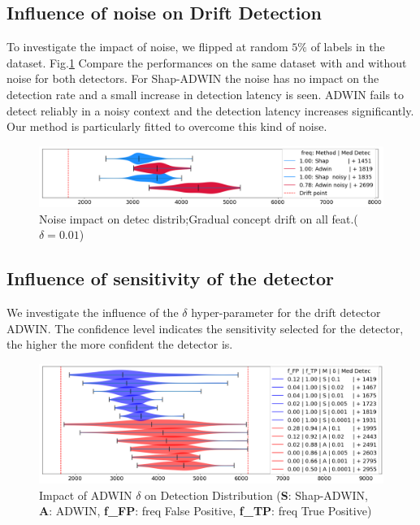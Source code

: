 \documentclass[runningheads]{llncs}
\begin{document}
\subsection{Influence of noise on Drift Detection}
To investigate the impact of noise, we flipped at random $5\%$ of labels in the dataset. Fig.\ref{fig: noise_violin} Compare the performances on the same dataset with and without noise for both detectors. For Shap-ADWIN the noise has no impact on the detection rate and a small increase in detection latency is seen. ADWIN fails to detect reliably in a noisy context and the detection latency increases significantly. Our method is particularly fitted to overcome this kind of noise.

\begin{figure}[htbp]
    \begin{center}
        \includegraphics[width=0.9\linewidth]{noise_violin.png}
        \caption{Noise impact on detec distrib;Gradual concept drift on all feat.\centering($\delta = 0.01$)}
        \label{fig: noise_violin}
    \end{center}
\end{figure}

\subsection{Influence of sensitivity of the detector}
We investigate the influence of the $\delta$ hyper-parameter for the drift detector ADWIN. The confidence level indicates the sensitivity selected for the detector, the higher the more confident the detector is.

\begin{figure}[htbb]
    \begin{center}
        \includegraphics[width=0.9\linewidth]{beta_violin.png}
        \caption{Impact of ADWIN $\delta$ on Detection Distribution (\textbf{S}: Shap-ADWIN,\\ \textbf{A}: ADWIN, \textbf{f\_FP}: freq False Positive, \textbf{f\_TP}: freq True Positive)}
        \label{fig: beta violin}
    \end{center}
\end{figure}
\end{document}
